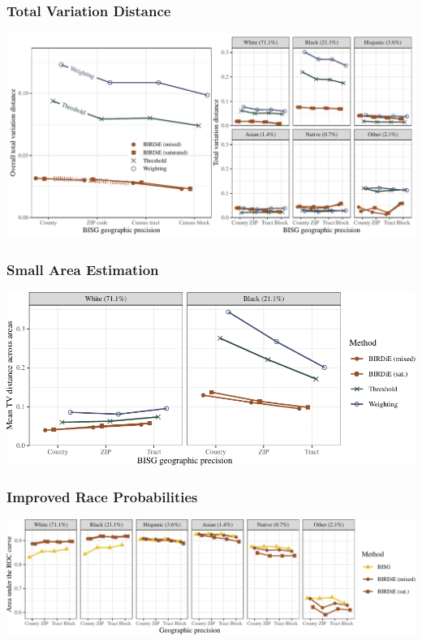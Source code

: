 \documentclass[handout]{beamer}
\begin{document}
\begin{frame}

  \frametitle{Total Variation Distance}

  \includegraphics[width=\textwidth]{../paper/figures/nc_tv.pdf}

\end{frame}

\begin{frame}

  \frametitle{Small Area Estimation}

 \includegraphics[width=\textwidth]{../paper/figures/nc_smallarea.pdf}


\end{frame}

\begin{frame}

  \frametitle{Improved Race Probabilities}

 \includegraphics[width=\textwidth]{../paper/figures/nc_roc.pdf}


\end{frame}
\end{document}
